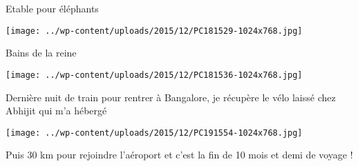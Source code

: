 

 Etable pour éléphants 

 

\begin{center} \texttt{[image: ../wp-content/uploads/2015/12/PC181529-1024x768.jpg]} \end{center}

 

 Bains de la reine 

 

\begin{center} \texttt{[image: ../wp-content/uploads/2015/12/PC181536-1024x768.jpg]} \end{center}

 

 Dernière nuit de train pour rentrer à Bangalore, je récupère le vélo laissé chez Abhijit qui m'a hébergé 

 

\begin{center} \texttt{[image: ../wp-content/uploads/2015/12/PC191554-1024x768.jpg]} \end{center}

 

 Puis 30 km pour rejoindre l'aéroport et c'est la fin de 10 mois et demi de voyage !


 
 
